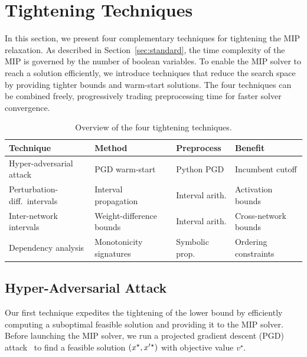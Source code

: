\section{Tightening Techniques}
\label{sec:flags}

In this section, we present four complementary techniques for tightening the MIP relaxation. As described in Section~\ref{sec:standard}, the time complexity of the MIP is governed by the number of boolean variables. To enable the MIP solver to reach a solution efficiently, we introduce techniques that reduce the search space by providing tighter bounds and warm-start solutions. The four techniques can be combined freely, progressively trading preprocessing time for faster solver convergence.

\begin{table}[ht]
  \centering
  \caption{Overview of the four tightening techniques.}
  \label{tab:flags}
  \begin{tabular}{llll}
    \toprule
    \textbf{Technique} & \textbf{Method} & \textbf{Preprocess} & \textbf{Benefit} \\
    \midrule
    Hyper-adversarial attack
      & PGD warm-start   & Python PGD & Incumbent cutoff \\
    Perturbation-diff.\ intervals
      & Interval propagation & Interval arith. & Activation bounds \\
    Inter-network intervals
      & Weight-difference bounds & Interval arith. & Cross-network bounds \\
    Dependency analysis
      & Monotonicity signatures & Symbolic prop. & Ordering constraints \\
    \bottomrule
  \end{tabular}
\end{table}

\subsection{Hyper-Adversarial Attack}
\label{sec:flag:hyper}

Our first technique expedites the tightening of the lower bound by efficiently computing a suboptimal feasible solution and providing it to the MIP solver. Before launching the MIP solver, we run a projected gradient descent (PGD) attack~\cite{madry2018} to find a feasible solution $(x^\star, x'{}^\star)$ with objective value $v^\star$.

